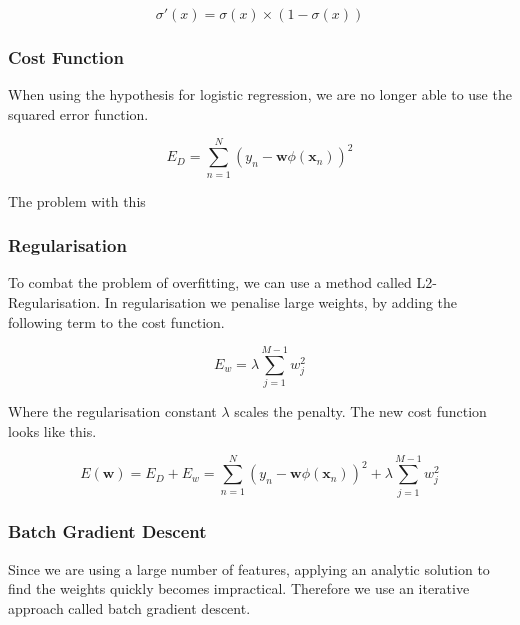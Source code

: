 \[ \sigma'(x) = \sigma(x) \times (1-\sigma(x)) \] 

\subsubsection{Cost Function}



When using the hypothesis for logistic regression, we are no longer able to use the squared error function.

\[ E_D = \sum_{n=1}^{N} \left(y_n - \textbf{w} \phi(\textbf{x}_n) \right)^2 \] 

The problem with this %




\subsubsection{Regularisation}
To combat the problem of overfitting, we can use a method called L2-Regularisation.
In regularisation we penalise large weights, by adding the following term to the cost function.

\[ E_w = \lambda \sum_{j=1}^{M-1} w_j^2 \]

Where the regularisation constant $\lambda$ scales the penalty. 
The new cost function looks like this.

\[ E(\textbf{w})
  = E_D + E_w 
  = \sum_{n=1}^{N} \left(y_n - \textbf{w} \phi(\textbf{x}_n) \right)^2 + \lambda \sum_{j=1}^{M-1} w_j^2 \]

\begin{flushright}
\cite[online course]{courseraAI}
\end{flushright}

\subsubsection{Batch Gradient Descent}

Since we are using a large number of features, applying an analytic solution to find the weights quickly becomes impractical.
Therefore we use an iterative approach called batch gradient descent.

